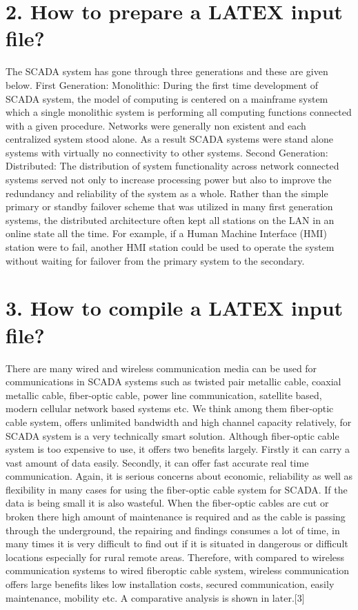 \documentclass[conference]{IEEEtran}
\begin{document}
\begin{Summary - }
\section{2. How to prepare a LATEX input file?}
\label{sec:op}

The SCADA system has gone through three generations
and these are given below. First Generation: Monolithic:
During the first time development of SCADA system, the
model of computing is centered on a mainframe system which
a single monolithic system is performing all computing
functions connected with a given procedure. Networks were
generally non existent and each centralized system stood alone.
As a result SCADA systems were stand alone systems with
virtually no connectivity to other systems. Second Generation:
Distributed: The distribution of system functionality across
network connected systems served not only to increase
processing power but also to improve the redundancy and
reliability of the system as a whole. Rather than the simple
primary or standby failover scheme that was utilized in many
first generation systems, the distributed architecture often kept
all stations on the LAN in an online state all the time. For
example, if a Human Machine Interface (HMI) station were to
fail, another HMI station could be used to operate the system
without waiting for failover from the primary system to the
secondary. 

\vspace{1cm}

\section{3. How to compile a LATEX input file?}
There are many wired and wireless communication media
can be used for communications in SCADA systems such as
twisted pair metallic cable, coaxial metallic cable, fiber-optic
cable, power line communication, satellite based, modern
cellular network based systems etc. We think among them
fiber-optic cable system, offers unlimited bandwidth and high
channel capacity relatively, for SCADA system is a very
technically smart solution. Although fiber-optic cable system is
too expensive to use, it offers two benefits largely. Firstly it can
carry a vast amount of data easily. Secondly, it can offer fast
accurate real time communication. Again, it is serious concerns
about economic, reliability as well as flexibility in many cases
for using the fiber-optic cable system for SCADA. If the data is
being small it is also wasteful. When the fiber-optic cables are
cut or broken there high amount of maintenance is required and
as the cable is passing through the underground, the repairing
and findings consumes a lot of time, in many times it is very
difficult to find out if it is situated in dangerous or difficult
locations especially for rural remote areas. Therefore, with
compared to wireless communication systems to wired fiberoptic cable system, wireless communication offers large
benefits likes low installation costs, secured communication,
easily maintenance, mobility etc. A comparative analysis is
shown in later.[3]


\end{Summary - }
\end{document}
